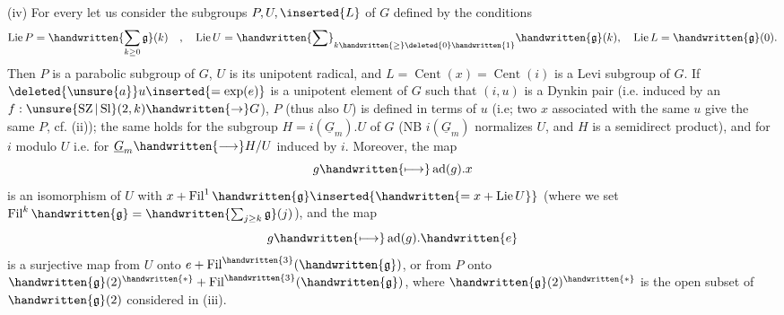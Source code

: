 (iv) For every  let us consider the subgroups $P,U,\inserted{L}$ of $G$ defined by the conditions
\[
\operatorname{Lie}P=\handwritten{\sum_{k\geq0}\mathfrak{g}}(k)\quad,\quad
\operatorname{Lie}U=\handwritten{\sum}_{k\handwritten{\geq}\deleted{0}\handwritten{1}}\handwritten{\mathfrak{g}}(k),\quad
\operatorname{Lie}L=\handwritten{\mathfrak{g}}(0).
\]
Then $P$ is a parabolic subgroup of $G$, $U$ is its unipotent radical, and $L=\operatorname{Cent}(x)=\operatorname{Cent}(i)$  is a Levi subgroup of $G$. If $\deleted{\unsure{a}}u\inserted{=\exp(e)}$ is a unipotent element of $G$ such that $(i,u)$ is a Dynkin pair (i.e. induced by an $f:\unsure{\operatorname{SZ}|\operatorname{Sl}}(2,k)\handwritten{\to}G$), $P$ (thus also $U$) is defined in terms of $u$ (i.e; two $x$ associated with the same $u$ give the same $P$, cf. (ii)); the same holds for the subgroup $H=i(\underline{G}_m).U$ of $G$ (NB $i(\underline{G}_m)$ normalizes $U$, and $H$ is a semidirect product), and for $i$ modulo $U$ i.e. for $\underline{G}_m\handwritten{\longrightarrow}H/U$ induced by $i$. Moreover, the map
\[
g\handwritten{\longmapsto}\operatorname{ad}(g).x
\]
is an isomorphism of $U$ with $x+\operatorname{Fil}^{1}\handwritten{\mathfrak{g}}\inserted{\handwritten{=x+\operatorname{Lie}U}}$ (where we set $\operatorname{Fil}^{k}\handwritten{\mathfrak{g}}=\handwritten{\sum_{j\geq k}\mathfrak{g}}(j)$), and the map
\[
g\handwritten{\longmapsto}\operatorname{ad}(g).\handwritten{e}
\]
is a surjective map from $U$ onto $e+\operatorname{Fil}^{\handwritten{3}}(\handwritten{\mathfrak{g}})$, or from $P$ onto $\handwritten{\mathfrak{g}}(2)^{\handwritten{*}}+\operatorname{Fil}^{\handwritten{3}}(\handwritten{\mathfrak{g}})$, where $\handwritten{\mathfrak{g}}(2)^{\handwritten{*}}$ is the open subset of $\handwritten{\mathfrak{g}}(2)$ considered in (iii).
